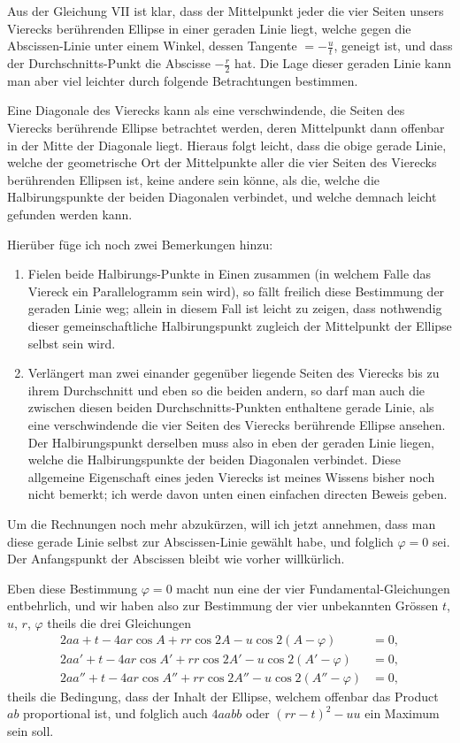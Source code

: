 \documentclass[fontsize=10pt,paper=a5,pagesize,headings=small,headinclude=true,footinclude=true]{scrbook}
\begin{document}
Aus der Gleichung VII ist klar, dass der Mittelpunkt jeder die vier Seiten unsers Vierecks berührenden Ellipse in einer geraden Linie liegt, welche gegen die Abscissen-Linie unter einem Winkel, dessen Tangente $= -\frac{u}{t}$, geneigt ist, und dass der Durchschnitts-Punkt die Abscisse $-\frac{r}{2}$ hat. Die Lage dieser geraden Linie kann man aber viel leichter durch folgende Betrachtungen bestimmen.

Eine Diagonale des Vierecks kann als eine verschwindende, die Seiten des Vierecks berührende Ellipse betrachtet werden, deren Mittelpunkt dann offenbar in der Mitte der Diagonale liegt. Hieraus folgt leicht, dass die obige gerade Linie, welche der geometrische Ort der Mittelpunkte aller die vier Seiten des Vierecks berührenden Ellipsen ist, keine andere sein könne, als die, welche die Halbirungspunkte der beiden Diagonalen verbindet, und welche demnach leicht gefunden werden kann.

Hierüber füge ich noch zwei Bemerkungen hinzu:
\begin{enumerate}
\item Fielen beide Halbirungs-Punkte in Einen zusammen (in welchem Falle das Viereck ein Parallelogramm sein wird), so fällt freilich diese Bestimmung der geraden Linie weg; allein in diesem Fall ist leicht zu zeigen, dass nothwendig dieser gemeinschaftliche Halbirungspunkt zugleich der Mittelpunkt der Ellipse selbst sein wird.
\item Verlängert man zwei einander gegenüber liegende Seiten des Vierecks bis zu ihrem Durchschnitt und eben so die beiden andern, so darf man auch die zwischen diesen beiden Durchschnitts-Punkten enthaltene gerade Linie, als eine verschwindende die vier Seiten des Vierecks berührende Ellipse ansehen. Der Halbirungspunkt derselben muss also in eben der geraden Linie liegen, welche die Halbirungspunkte der beiden Diagonalen verbindet. Diese allgemeine Eigenschaft eines jeden Vierecks ist meines Wissens bisher noch nicht bemerkt; ich werde davon unten einen einfachen directen Beweis geben.
\end{enumerate}

Um die Rechnungen noch mehr abzukürzen, will ich jetzt annehmen, dass man diese gerade Linie selbst zur Abscissen-Linie gewählt habe, und folglich $\varphi = 0$ sei. Der Anfangspunkt der Abscissen bleibt wie vorher willkürlich.

Eben diese Bestimmung $\varphi = 0$ macht nun eine der vier Fundamental-Gleichungen entbehrlich, und wir haben also zur Bestimmung der vier unbekannten Grössen $t$, $u$, $r$, $\varphi$ theils die drei Gleichungen
\begin{align*}
2aa + t - 4ar\cos A + rr\cos 2A - u\cos 2(A - \varphi) &= 0,\\
2aa' + t - 4ar\cos A' + rr\cos 2A' - u\cos 2(A' - \varphi) &= 0,\\
2aa'' + t - 4ar\cos A'' + rr\cos 2A'' - u\cos 2(A'' - \varphi) &= 0,
\end{align*}
theils die Bedingung, dass der Inhalt der Ellipse, welchem offenbar das Product $ab$ proportional ist, und folglich auch $4aa bb$ oder $(rr-t)^2 - uu$ ein Maximum sein soll.
\end{document}
